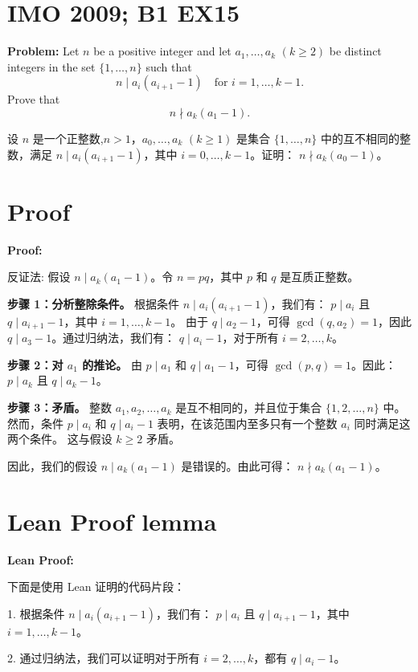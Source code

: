 \documentclass[a4paper]{article}
\begin{document}
\section*{IMO 2009; B1 EX15}
    \textbf{Problem:}
    Let $n$ be a positive integer and let $a_1,\ldots,a_k$ $(k \geq 2)$ be distinct integers in the set $\{1,\ldots,n\}$ such that 
    \[n \mid a_i(a_{i+1}-1) \quad \text{for } i = 1,\ldots,k-1.\]
    Prove that 
    \[n \nmid a_k(a_1-1).\]

    \[ \]
    设 $n$ 是一个正整数,$n > 1$，$a_0, \ldots, a_k$ $(k \geq 1)$ 是集合 $\{1, \ldots, n\}$ 中的互不相同的整数，满足
    $n \mid a_i(a_{i+1}-1)$，其中 $i = 0, \ldots, k-1$。证明：
    $n \nmid a_k(a_0-1)$。


\section*{Proof}
    \textbf{Proof:}

    反证法: 假设 $n \mid a_k(a_1-1)$。令 $n = pq$，其中 $p$ 和 $q$ 是互质正整数。

    \textbf{步骤 1：分析整除条件。}  
    根据条件 $n \mid a_i(a_{i+1}-1)$，我们有：
    $p \mid a_i$ 且 $q \mid a_{i+1}-1$，其中 $i = 1, \ldots, k-1$。
    由于 $q \mid a_2-1$，可得 $\gcd(q, a_2) = 1$，因此 $q \mid a_3-1$。通过归纳法，我们有：
    $q \mid a_i-1$，对于所有 $i = 2, \ldots, k$。

    \textbf{步骤 2：对 $a_1$ 的推论。}  
    由 $p \mid a_1$ 和 $q \mid a_1-1$，可得 $\gcd(p, q) = 1$。因此：
    $p \mid a_k$ 且 $q \mid a_k-1$。

    \textbf{步骤 3：矛盾。}  
    整数 $a_1, a_2, \ldots, a_k$ 是互不相同的，并且位于集合 $\{1, 2, \ldots, n\}$ 中。
    然而，条件 $p \mid a_i$ 和 $q \mid a_i-1$ 表明，在该范围内至多只有一个整数 $a_i$ 同时满足这两个条件。
    这与假设 $k \geq 2$ 矛盾。

    因此，我们的假设 $n \mid a_k(a_1-1)$ 是错误的。由此可得：
    $n \nmid a_k(a_1-1)$。

\section*{Lean Proof lemma}
    \textbf{Lean Proof:}

    下面是使用 Lean 证明的代码片段：

    1. 根据条件 $n \mid a_i(a_{i+1}-1)$，我们有：
    $p \mid a_i$ 且 $q \mid a_{i+1}-1$，其中 $i = 1, \ldots, k-1$。

    2. 通过归纳法，我们可以证明对于所有 $i = 2, \ldots, k$，都有 $q \mid a_i-1$。
\end{document}
